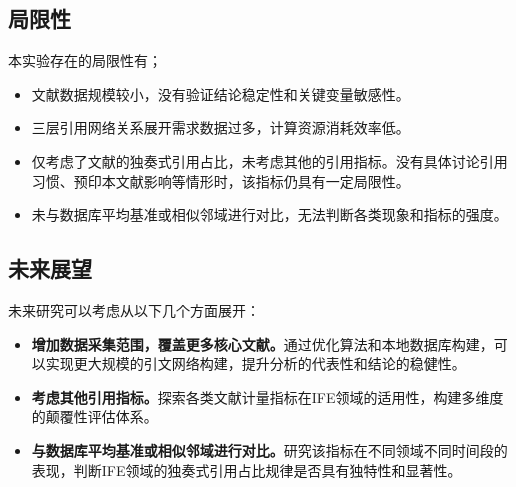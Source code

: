 \documentclass[12pt,hyperref,a4paper,UTF8]{ctexart}
\begin{document}
    \subsection{局限性}
    本实验存在的局限性有；
    \begin{itemize}
        \item 文献数据规模较小，没有验证结论稳定性和关键变量敏感性。
        \item 三层引用网络关系展开需求数据过多，计算资源消耗效率低。
        \item 仅考虑了文献的独奏式引用占比，未考虑其他的引用指标。没有具体讨论引用习惯、预印本文献影响等情形时，该指标仍具有一定局限性。
        \item 未与数据库平均基准或相似邻域进行对比，无法判断各类现象和指标的强度。
    \end{itemize}

    \subsection{未来展望}
    未来研究可以考虑从以下几个方面展开：
    \begin{itemize}
        \item \textbf{增加数据采集范围，覆盖更多核心文献。}通过优化算法和本地数据库构建，可以实现更大规模的引文网络构建，提升分析的代表性和结论的稳健性。
        \item \textbf{考虑其他引用指标。}探索各类文献计量指标在IFE领域的适用性，构建多维度的颠覆性评估体系。
        \item \textbf{与数据库平均基准或相似邻域进行对比。}研究该指标在不同领域不同时间段的表现，判断IFE领域的独奏式引用占比规律是否具有独特性和显著性。
    \end{itemize}
\end{document}
